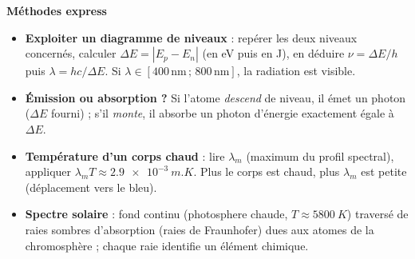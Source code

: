 \documentclass[11pt]{article}
\begin{document}
\begin{bilan}
\textbf{M\'ethodes express}
\begin{itemize}
  \item \textbf{Exploiter un diagramme de niveaux} : rep\'erer les deux niveaux concern\'es, calculer $\Delta E = |E_p-E_n|$ (en eV puis en J), en d\'eduire $\nu = \Delta E/h$ puis $\lambda = hc/\Delta E$. Si $\lambda \in [400\,\text{nm}\,;\,800\,\text{nm}]$, la radiation est visible.
  \item \textbf{\'Emission ou absorption ?} Si l'atome \emph{descend} de niveau, il \'emet un photon ($\Delta E$ fourni) ; s'il \emph{monte}, il absorbe un photon d'\'energie exactement \'egale \`a $\Delta E$.
  \item \textbf{Temp\'erature d'un corps chaud} : lire $\lambda_m$ (maximum du profil spectral), appliquer $\lambda_m T \approx \SI{2,9e-3}{m.K}$. Plus le corps est chaud, plus $\lambda_m$ est petite (d\'eplacement vers le bleu).
  \item \textbf{Spectre solaire} : fond continu (photosphere chaude, $T \approx \SI{5800}{K}$) travers\'e de raies sombres d'absorption (raies de Fraunhofer) dues aux atomes de la chromosph\`ere ; chaque raie identifie un \'el\'ement chimique.
\end{itemize}
\end{bilan}
\end{document}

